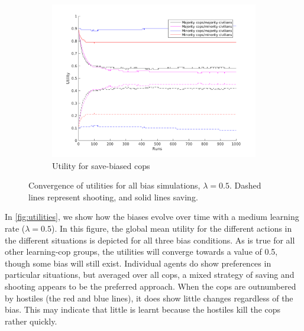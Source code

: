 \begin{figure}[!ht]
\begin{subfigure}[b]{0.62\textwidth}
        \includegraphics[width=\textwidth]{./pictures/Utility05BiasSave}
        \caption{Utility for save-biased cops }
        \label{fig:utSave}
    \end{subfigure}
\caption{Convergence of utilities for all bias simulations, $\lambda = 0.5$. Dashed lines represent shooting, and solid lines saving. }
\label{fig:utilities}
\end{figure}
In \autoref{fig:utilities}, we show how the biases evolve over time with a medium learning rate ($\lambda = 0.5$). In this figure, the global mean utility for the different actions in the different situations is depicted for all three bias conditions. As is true for all other learning-cop groups, the utilities will converge towards a value of 0.5, though some bias will still exist. Individual agents do show preferences in particular situations, but averaged over all cops, a mixed strategy of saving and shooting appears to be the preferred approach. When the cops are outnumbered by hostiles (the red and blue lines), it does show little changes regardless of the bias. This may indicate that little is learnt because the hostiles kill the cops rather quickly. 

